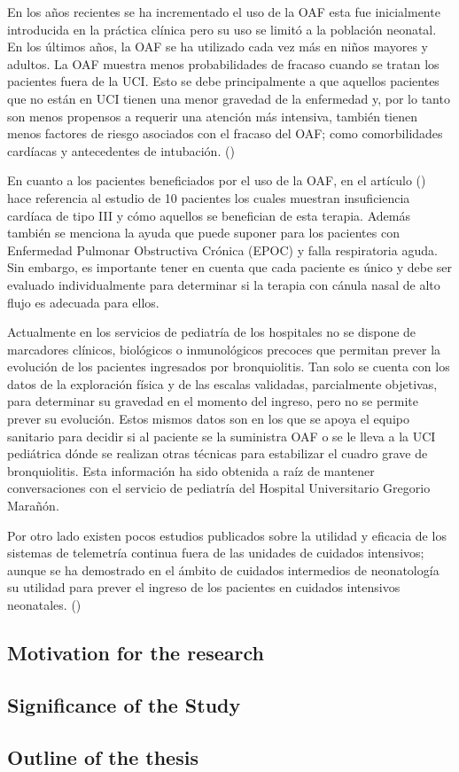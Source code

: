 En los años recientes se ha incrementado el uso de la OAF esta fue inicialmente introducida en la práctica clínica pero su uso se limitó a la población neonatal. En los últimos años, la OAF se ha utilizado cada vez más en niños mayores y adultos. La OAF muestra menos probabilidades de fracaso cuando se tratan los pacientes fuera de la UCI. Esto se debe principalmente a que aquellos pacientes que no están en UCI tienen una menor gravedad de la enfermedad y, por lo tanto son menos propensos a requerir una atención más intensiva, también tienen menos factores de riesgo asociados con el fracaso del OAF; como comorbilidades cardíacas y antecedentes de intubación. (\cite{Betters2017}) 

En cuanto a los pacientes beneficiados por el uso de la OAF, en el artículo (\cite{Lodeserto2018}) hace referencia al estudio de 10 pacientes los cuales muestran insuficiencia cardíaca de tipo III y cómo aquellos se benefician de esta terapia. Además también se menciona la ayuda que puede suponer para los pacientes con Enfermedad Pulmonar Obstructiva Crónica (EPOC) y falla respiratoria aguda. Sin embargo, es importante tener en cuenta que cada paciente es único y debe ser evaluado individualmente para determinar si la terapia con cánula nasal de alto flujo es adecuada para ellos.

Actualmente en los servicios de pediatría de los hospitales no se dispone de marcadores clínicos, biológicos o inmunológicos precoces que permitan prever la evolución de los pacientes ingresados por bronquiolitis. Tan solo se cuenta con los datos de la exploración física y de las escalas validadas, parcialmente objetivas, para determinar su gravedad en el momento del ingreso, pero no se permite prever su evolución. Estos mismos datos son en los que se apoya el equipo sanitario para decidir si al paciente se la suministra OAF o se le lleva a la UCI pediátrica dónde se realizan otras técnicas para estabilizar el cuadro grave de bronquiolitis. Esta información ha sido obtenida a raíz de mantener conversaciones con el servicio de pediatría del Hospital Universitario Gregorio Marañón. 

Por otro lado existen pocos estudios publicados sobre la utilidad y eficacia de los sistemas de telemetría continua fuera de las unidades de cuidados intensivos; aunque se ha demostrado en el ámbito de cuidados intermedios de neonatología su utilidad para prever el ingreso de los pacientes en cuidados intensivos neonatales. (\cite{Solis2022})

\subsection{Motivation for the research}

\subsection{Significance of the Study}


\subsection{Outline of the thesis}


